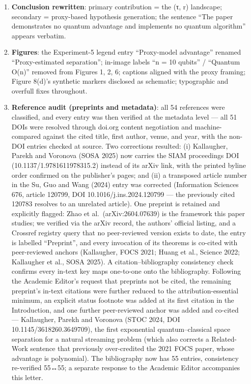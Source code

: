 \documentclass[
  11pt,
]{article}
\begin{document}
\begin{enumerate}
  \textbf{New ``Threats to Validity'' section} (construct / internal /
  external / statistical-conclusion) and a promoted, expanded
  \textbf{Future Work} section.
\item
  \textbf{Conclusion rewritten}: primary contribution = the (τ, r)
  landscape; secondary = proxy-based hypothesis generation; the sentence
  ``The paper demonstrates no quantum advantage and implements no
  quantum algorithm'' appears verbatim.
\item
  \textbf{Figures}: the Experiment-5 legend entry ``Proxy-model
  advantage'' renamed ``Proxy-estimated separation''; in-image labels
  ``n = 10 qubits'' / ``Quantum O(n)'' removed from Figures 1, 2, 6;
  captions aligned with the proxy framing; Figure 8(d)'s synthetic
  markers disclosed as schematic; typographic and overfull fixes
  throughout.
\item
  \textbf{Reference audit (preprints and metadata)}: all 54 references
  were classified, and every entry was then verified at the metadata
  level --- all 51 DOIs were resolved through doi.org content
  negotiation and machine-compared against the cited title, first
  author, venue, and year, with the non-DOI entries checked at source.
  Two corrections resulted: (i) Kallaugher, Parekh and Voronova (SOSA
  2025) now carries the SIAM proceedings DOI (10.1137/1.9781611978315.2)
  instead of its arXiv link, with the printed byline order confirmed on
  the publisher's pages; and (ii) a transposed article number in the Su,
  Guo and Wang (2024) entry was corrected (Information Sciences 676,
  article 120799, DOI 10.1016/j.ins.2024.120799 --- the previously cited
  120783 resolves to an unrelated article). One preprint is retained and
  explicitly flagged: Zhao et al.~(arXiv:2604.07639) is the framework
  this paper studies; we verified via the arXiv record, the authors'
  official listing, and a Crossref registry query that no peer-reviewed
  version exists to date, the entry is labelled ``Preprint'', and every
  invocation of its theorems is co-cited with peer-reviewed anchors
  (Kallaugher, FOCS 2021; Huang et al., Science 2022; Kallaugher et al.,
  SOSA 2025). A citation--bibliography consistency check confirms every
  in-text key maps one-to-one onto the bibliography. Following the
  Academic Editor's request that preprints not be cited, the remaining
  preprint's in-text citations were further reduced to the
  attribution-essential minimum, an explicit status footnote was added
  at its first citation in the Introduction, and one further
  peer-reviewed anchor was added and co-cited --- Kallaugher, Parekh and
  Voronova (STOC 2024, DOI 10.1145/3618260.3649709), the first
  exponential quantum--classical space separation for a natural
  streaming problem (which also corrects a Related-Work sentence that
  previously over-credited the 2021 FOCS paper, whose advantage is
  polynomial). The bibliography now has 55 entries, consistency
  re-verified 55↔55; a separate response to the Academic Editor
  accompanies this letter.
\end{enumerate}
\end{document}
